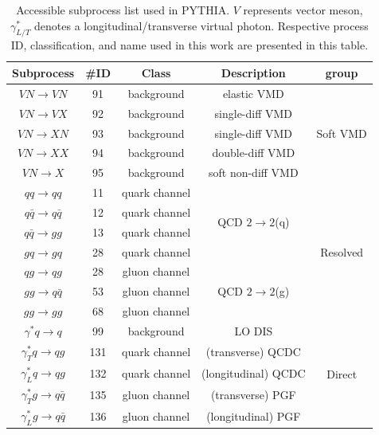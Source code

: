 \begin{table} 
\centering
\begin{tabular} {|c|c|c|c|c|}
\hline
Subprocess			& \#ID&	Class	&	Description		&	group					 \\
\hline
$VN \rightarrow VN$	& 91& background& elastic VMD		& \multirow{5}{*}{Soft VMD}  \\
$VN \rightarrow VX$	& 92& background& single-diff VMD	& 							  \\
$VN \rightarrow XN$	& 93& background& single-diff VMD	&							  \\
$VN \rightarrow	XX$	& 94& background& double-diff VMD	&							  \\
$VN \rightarrow X$	& 95& background& soft non-diff VMD	&							  \\
\hline
$qq \rightarrow qq$	& 11& quark channel& \multirow{4}{*}{QCD $2\rightarrow 2$(q)} & \multirow{7}{*}{Resolved} \\
$q\bar{q} \rightarrow q\bar{q}$	& 12& quark channel&		&	\\
$q\bar{q} \rightarrow gg$	& 13& quark channel&			&	\\
$gq \rightarrow gq$	& 28& quark channel&					&	\\

$qg \rightarrow qg$	& 28& gluon channel	& \multirow{3}{*}{QCD $2\rightarrow 2$(g)} &	\\
$gg \rightarrow q\bar{q}$ & 53& gluon channel&				&	\\
$gg \rightarrow gg$	& 68& gluon channel	&					&	\\
\hline
$\gamma^{*}q \rightarrow q$	& 99& background& LO DIS	&	\multirow{5}{*}{Direct}	\\
$\gamma^{*}_{T}q \rightarrow qg$ & 131& quark channel& (transverse) QCDC	&	\\
$\gamma^{*}_{L}q \rightarrow qg$ & 132& quark channel& (longitudinal) QCDC	&	\\
$\gamma^{*}_{T}g \rightarrow q\bar{q}$ & 135& gluon channel& (transverse) PGF	&	\\
$\gamma^{*}_{L}g \rightarrow q\bar{q}$ & 136& gluon channel& (longitudinal) PGF	&	\\
\hline
\end{tabular}
\caption[Subprocesses implemented in PYTHIA event generator]{Accessible subprocess list used in PYTHIA. $V$ represents vector meson, $\gamma^{*}_{L/T}$ denotes a longitudinal/transverse virtual photon. Respective process ID,  classification, and name used in this work are presented in this table.}\label{tab:processList}
\end{table}


